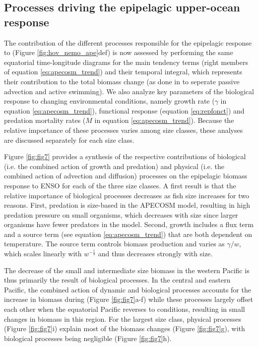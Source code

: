 \subsection{Processes driving the epipelagic upper-ocean response}

The contribution of the different processes responsible for the epipelagic response to \nino{} (Figure \ref{fig:hov_nemo_ape}def) is now assessed by performing the same equatorial time-longitude diagrams for the main tendency terms (right members of equation \ref{eq:apecosm_trend}) and their temporal integral, which represents their contribution to the total biomass change (as done in \citealt{guietMovementShapesStructure2022} to seperate passive advection and active swimming). We also analyze key parameters of the biological response to changing environmental conditions, namely growth rate ($\gamma$ in equation \ref{eq:apecosm_trend}), functional response (equation \ref{eq:repfonct}) and predation mortality rates ($M$ in equation \ref{eq:apecosm_trend}). Because the relative importance of these processes varies among size classes, these analyses are discussed separately for each size class.

Figure \ref{fig:fig7} provides a synthesis of the respective contributions of biological (i.e. the combined action of growth and predation) and physical (i.e. the combined action of advection and diffusion) processes on the epipelagic biomass response to ENSO for each of the three size classes. A first result is that the relative importance of biological processes decreases as fish size increases for two reasons. First, predation is size-based in the APECOSM model, resulting in high predation pressure on small organisms, which decreases with size since larger organisms have fewer predators in the model. Second, growth includes a flux term and a source term (see equation \ref{eq:apecosm_trend}) that are both dependent on temperature. The source term controls biomass production and varies as ${\gamma}/{w}$, which scales linearly with $w^{-\frac{1}{3}}$ and thus decreases strongly with size.

The decrease of the small and intermediate size biomass in the western Pacific is thus primarily the result of biological processes. In the central and eastern Pacific, the combined action of dynamic and biological processes accounts for the increase in biomass during \nino{} (Figure \ref{fig:fig7}a-f) while these processes largely offset each other when the equatorial Pacific reverses to \nina{} conditions, resulting in small  changes in biomass in this region. For the largest size class, physical processes (Figure \ref{fig:fig7}i) explain most of the biomass changes (Figure \ref{fig:fig7}g), with biological processes being negligible (Figure \ref{fig:fig7}h).


